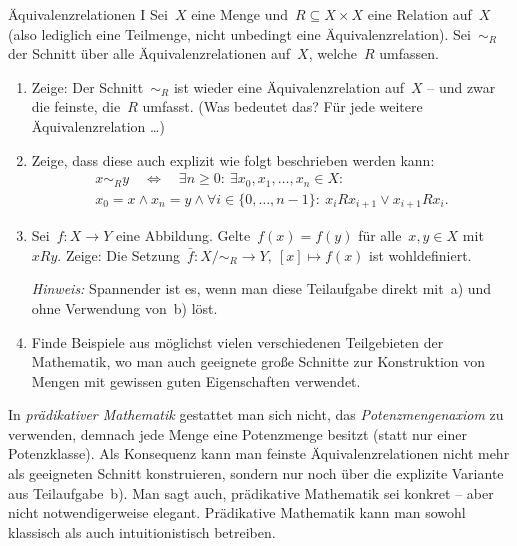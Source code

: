 \documentclass{uebblatt}
\begin{document}

\begin{aufgabe}{Äquivalenzrelationen I}
Sei~$X$ eine Menge und~$R \subseteq X \times X$ eine Relation auf~$X$
(also lediglich eine Teilmenge, nicht unbedingt eine Äquivalenzrelation).
Sei~$\sim_R$ der Schnitt über alle Äquivalenzrelationen auf~$X$, welche~$R$
umfassen.
\begin{enumerate}
\item Zeige: Der Schnitt~$\sim_R$ ist wieder eine Äquivalenzrelation auf~$X$
-- und zwar die feinste, die~$R$ umfasst. (Was bedeutet das? Für jede weitere
Äquivalenzrelation \ldots)

\item Zeige, dass diese auch explizit wie folgt beschrieben
werden kann:
\begin{multline*}
  x \sim_R y \quad\Longleftrightarrow\quad
  \exists n \geq 0{:}\
  \exists x_0,x_1,\ldots,x_n \in X{:} \\
  x_0 = x \wedge x_n = y \wedge
  \forall i \in \{ 0 , \ldots, n-1 \}{:}\
  x_i R x_{i+1} \vee x_{i+1} R x_i.
\end{multline*}

\item Sei~$f : X \to Y$ eine Abbildung. Gelte~$f(x) = f(y)$ für alle~$x,y \in
X$ mit~$xRy$. Zeige: Die Setzung~$\bar f : X/{\sim_R} \to Y,\ [x] \mapsto f(x)$
ist wohldefiniert.

\emph{Hinweis:} Spannender ist es, wenn man diese Teilaufgabe direkt mit~a) und
ohne Verwendung von~b) löst.

\item Finde Beispiele aus möglichst vielen verschiedenen Teilgebieten der
Mathematik, wo man auch geeignete große Schnitte zur Konstruktion von Mengen
mit gewissen guten Eigenschaften verwendet.
\end{enumerate}

In \emph{prädikativer Mathematik} gestattet man sich nicht, das
\emph{Potenzmengenaxiom} zu verwenden, demnach jede Menge eine Potenzmenge
besitzt (statt nur einer Potenzklasse). Als Konsequenz kann man feinste
Äquivalenzrelationen nicht mehr als geeigneten Schnitt konstruieren, sondern
nur noch über die explizite Variante aus Teilaufgabe~b). Man sagt auch,
prädikative Mathematik sei konkret -- aber nicht notwendigerweise elegant.
Prädikative Mathematik kann man sowohl klassisch als auch intuitionistisch
betreiben.
\end{aufgabe}
\end{document}
